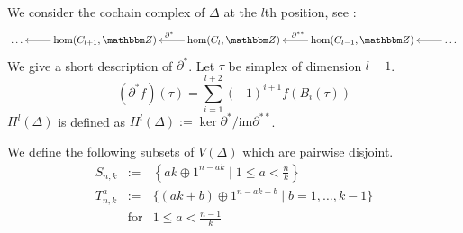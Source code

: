 \documentclass{elsarticle}
\def\Z{\mathbbm Z}
\def\im{\textrm{im}}
\begin{document}
We consider the cochain complex of $\Delta$ at the $l$th position, see \cite[Section 3.1]{hatcher}:
\[
\xymatrix{
\dots&\hom(C_{l+1},\Z)\ar[l]&\hom(C_l,\Z)\ar[l]_{\partial^*}&\hom(C_{l-1},\Z)\ar[l]_{\partial^{**}}&\dots\ar[l]
}
\]
We give a short description of $\partial^*$. Let $\tau$ be simplex of dimension $l+1$.
\[
(\partial^*f)(\tau)=\sum_{i=1}^{l+2}(-1)^{i+1}f(B_i(\tau))
\]
$H^l(\Delta)$ is defined as $H^l(\Delta):=\ker\partial^*/\im\partial^{**}$.

We define the following subsets of $V(\Delta)$ which are pairwise disjoint.
\begin{eqnarray*}
S_{n,k}&:=&\left\{ak\oplus 1^{n-ak}\mid 1\leq a<\frac nk\right\}\\
T_{n,k}^a&:=&\{(ak+b)\oplus 1^{n-ak-b}\mid b=1,\dots,k-1\}\\
&\text{for}&1\leq a<\frac {n-1}k
\end{eqnarray*}
\end{document}
